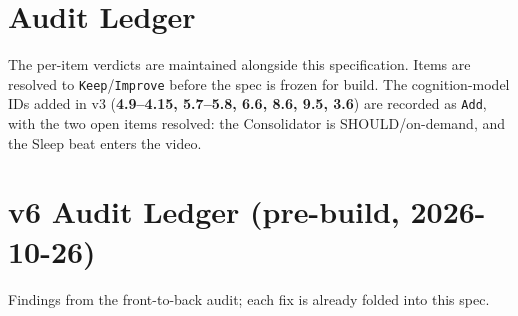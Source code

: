 \section{Audit Ledger}
The per-item verdicts are maintained alongside this specification. Items are resolved to
\texttt{Keep}/\texttt{Improve} before the spec is frozen for build. The cognition-model IDs added in
v3 (\textbf{4.9--4.15, 5.7--5.8, 6.6, 8.6, 9.5, 3.6}) are recorded as \texttt{Add}, with the two
open items resolved: the Consolidator is SHOULD/on-demand, and the Sleep beat enters the video.

\section{v6 Audit Ledger (pre-build, 2026-10-26)}
Findings from the front-to-back audit; each fix is already folded into this spec.
